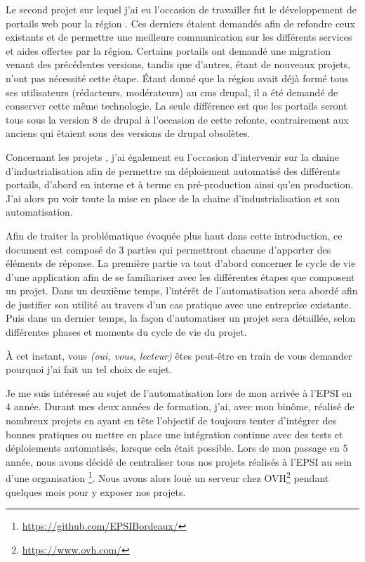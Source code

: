 Le second projet sur lequel j'ai eu l'occasion de travailler fut le développement de portails web pour la région \naq{}. Ces derniers étaient demandés afin de refondre ceux existants et de permettre une meilleure communication sur les différents services et aides offertes par la région. Certains portails ont demandé une migration venant des précédentes versions, tandis que d'autres, étant de nouveaux projets, n'ont pas nécessité cette étape. Étant donné que la région avait déjà formé tous ses utilisateurs (rédacteurs, modérateurs) au \gls{cms} \gls{drupal}, il a été demandé de conserver cette même technologie. La seule différence est que les portails seront tous sous la version 8 de \gls{drupal} à l'occasion de cette refonte, contrairement aux anciens qui étaient sous des versions de \gls{drupal} obsolètes. 

Concernant les projets \naq, j'ai également eu l'occasion d'intervenir sur la chaine d'industrialisation afin de permettre un déploiement automatisé des différents portails, d'abord en interne et à terme en pré-production ainsi qu'en production. J'ai alors pu voir toute la mise en place de la chaine d'industrialisation et son automatisation.

Afin de traiter la problématique évoquée plus haut dans cette introduction, ce document est composé de 3 parties qui permettront chacune d'apporter des éléments de réponse. La première partie va tout d'abord concerner le cycle de vie d'une application afin de se familiariser avec les différentes étapes que composent un projet. Dans un deuxième temps, l'intérêt de l'automatisation sera abordé afin de justifier son utilité au travers d'un cas pratique avec une entreprise existante. Puis dans un dernier temps, la façon d'automatiser un projet sera détaillée, selon différentes phases et moments du cycle de vie du projet.

À cet instant, vous \emph{(oui, vous, lecteur)} êtes peut-être en train de vous demander pourquoi j'ai fait un tel choix de sujet. 

Je me suis intéressé au sujet de l'automatisation lors de mon arrivée à l'EPSI en 4 année. Durant mes deux années de formation, j'ai, avec mon binôme, réalisé de nombreux projets en ayant en tête l'objectif de toujours tenter d'intégrer des bonnes pratiques ou mettre en place une intégration continue avec des tests et déploiements automatisés, lorsque cela était possible. Lors de mon passage en 5 année, nous avons décidé de centraliser tous nos projets réalisés à l'EPSI au sein d'une organisation \github\footnote{\url{https://github.com/EPSIBordeaux/}}. Nous avons alors loué un serveur chez OVH\footnote{\url{https://www.ovh.com/}} pendant quelques mois pour y exposer nos projets.

